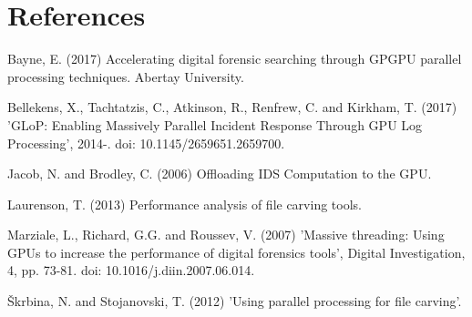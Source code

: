 \documentclass[12pt]{dissertation}
\begin{document}
\chapter*{References}
Bayne, E. (2017) Accelerating digital forensic searching through GPGPU parallel processing techniques. Abertay University.

Bellekens, X., Tachtatzis, C., Atkinson, R., Renfrew, C. and Kirkham, T. (2017) 'GLoP: Enabling Massively Parallel Incident Response Through GPU Log Processing', 2014-. doi: 10.1145/2659651.2659700.

Jacob, N. and Brodley, C. (2006) Offloading IDS Computation to the GPU.

Laurenson, T. (2013) Performance analysis of file carving tools.

Marziale, L., Richard, G.G. and Roussev, V. (2007) 'Massive threading: Using GPUs to increase the performance of digital forensics tools', Digital Investigation, 4, pp. 73-81. doi: 10.1016/j.diin.2007.06.014.

Škrbina, N. and Stojanovski, T. (2012) 'Using parallel processing for file carving'.
\end{document}

